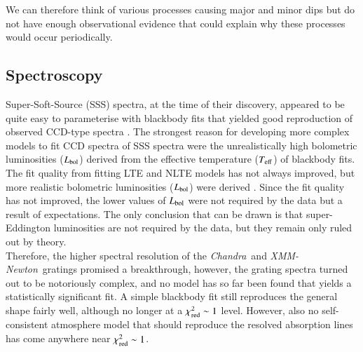 \documentclass{aa}
\newcommand{\chandra}{{\it Chandra}}
\newcommand{\xmm}{{\it XMM-Newton}}
\begin{document}

We can therefore think of various processes causing major and minor
dips but do not have enough observational evidence that could
explain why these processes would occur periodically.

\subsection{Spectroscopy}
\label{sect:disc:spex}

Super-Soft-Source (SSS) spectra, at the time of their discovery, appeared to
be quite easy to parameterise with blackbody fits that yielded good
reproduction of observed CCD-type spectra \citep[e.g.][]{krautt96}.
The strongest reason for developing more complex models to fit CCD spectra
of SSS spectra were the unrealistically high bolometric luminosities
($L_{\rm bol}$) derived from the effective temperature
($T_{\rm eff}$) of blackbody fits. The fit quality from
fitting LTE and NLTE models has not always improved, but more
realistic bolometric luminosities ($L_{\rm bol}$) were derived
\citep[e.g.][]{balm98,parmarcal87,parmarcal83}.
Since the fit quality has not improved, the lower values of $L_{\rm bol}$
were not
required by the data but a result of expectations. The only conclusion
that can be drawn is that super-Eddington luminosities are not required
by the data, but they remain only ruled out by theory.\\

Therefore, the higher spectral resolution of the \chandra\ and \xmm\
gratings promised a breakthrough, however, the grating spectra turned out
to be notoriously complex, and no model has so far been found that yields
a statistically significant fit. A simple blackbody fit still
reproduces the general shape fairly well, although no longer at a
$\chi^2_{\rm red}\sim 1$ level. However, also no self-consistent atmosphere
model that should reproduce the resolved absorption lines has come
anywhere near $\chi^2_{\rm red}\sim 1$.\\
\end{document}
